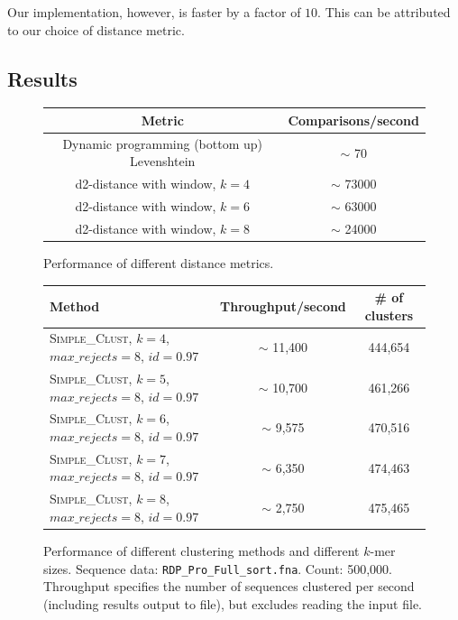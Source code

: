 Our implementation, however, is faster by a factor of $10$. This can be
attributed to our choice of distance metric.
\\


\subsection{Results}
\begin{figure}[H]
  \centering
  \begin{tabular}{ c | c }
    Metric                                        & Comparisons/second      \\
    \hline \hline
    Dynamic programming (bottom up) Levenshtein   & $\sim$ 70               \\
    \hline
    d2-distance with window, $k=4$                & $\sim$ 73000            \\
    \hline
    d2-distance with window, $k=6$                & $\sim$ 63000            \\
    \hline
    d2-distance with window, $k=8$                & $\sim$ 24000            \\
  \end{tabular}
  \caption{Performance of different distance metrics.}
\end{figure}

\begin{figure}[H]
  \centering
  \begin{tabular}{ p{12em} | c | c }
    Method  & Throughput/second   & \# of clusters \\
    \hline \hline
    \textsc{Simple\_Clust}, $k=4$,
    $max\_rejects=8$, $id=0.97$     & $\sim$ 11,400  & 444,654  \\
    \hline
    \textsc{Simple\_Clust}, $k=5$,
    $max\_rejects=8$, $id=0.97$     & $\sim$ 10,700  & 461,266  \\
    \hline
    \textsc{Simple\_Clust}, $k=6$,
    $max\_rejects=8$, $id=0.97$     & $\sim$ 9,575   & 470,516  \\
    \hline
    \textsc{Simple\_Clust}, $k=7$,
    $max\_rejects=8$, $id=0.97$     & $\sim$ 6,350   & 474,463  \\
    \hline
    \textsc{Simple\_Clust}, $k=8$,
    $max\_rejects=8$, $id=0.97$     & $\sim$ 2,750   & 475,465  \\
  \end{tabular}
  \caption{Performance of different clustering methods and different $k$-mer
  sizes. Sequence data:
           \texttt{RDP\_Pro\_Full\_sort.fna}. Count: 500,000. Throughput
           specifies the number of sequences clustered per second (including
           results output to file), but excludes reading the input file.}
\end{figure}
